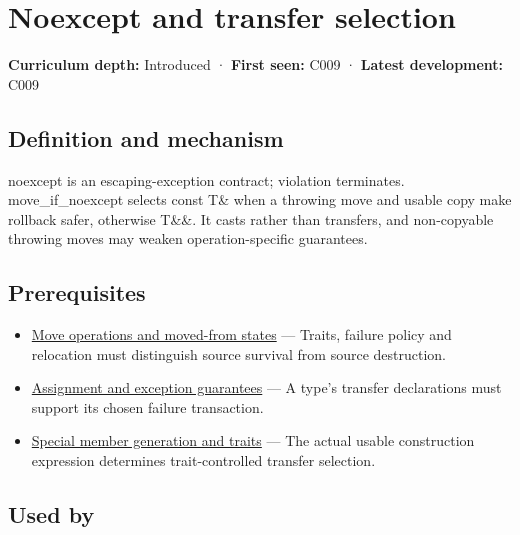 \hypertarget{appendix-c746afaa47d1}{}\label{referencestart:appendix-c746afaa47d1}
\section{Noexcept and transfer selection}\label{appendix-c746afaa47d1-noexcept-and-transfer-selection}

\textbf{Curriculum depth:} Introduced · \textbf{First seen:} C009 · \textbf{Latest development:} C009

\begin{allmightroledefinition}

\subsection{Definition and mechanism}\label{appendix-c746afaa47d1-definition-and-mechanism}

noexcept is an escaping-exception contract; violation terminates. move\_if\_noexcept selects const T\& when a throwing move and usable copy make rollback safer, otherwise T\&\&. It casts rather than transfers, and non-copyable throwing moves may weaken operation-specific guarantees.

\end{allmightroledefinition}

\subsection{Prerequisites}\label{appendix-c746afaa47d1-prerequisites}

\begin{itemize}
\tightlist
\item
  \hyperref[appendix-5636651017c2]{Move operations and moved-from states} --- Traits, failure policy and relocation must distinguish source survival from source destruction.
\item
  \hyperref[appendix-bea6beb5350f]{Assignment and exception guarantees} --- A type's transfer declarations must support its chosen failure transaction.
\item
  \hyperref[appendix-42e02a12c694]{Special member generation and traits} --- The actual usable construction expression determines trait-controlled transfer selection.
\end{itemize}

\subsection{Used by}\label{appendix-c746afaa47d1-used-by}

